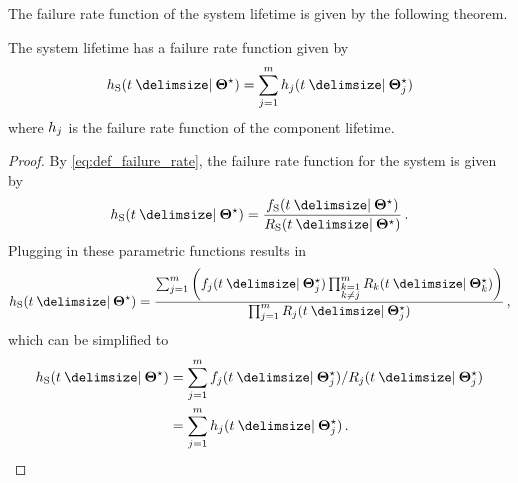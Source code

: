 \documentclass[
    11pt,
    extrafontsizes,
    article,
    oldfontcommands,
    final,
    oneside,
    openany,
    hidelinks]{memoir}
\begin{document}
The failure rate function of the system lifetime is given by the following theorem.
\begin{theorem}
\label{thm:series_failure_rate_function}
The system lifetime has a failure rate function given by
\begin{equation}
\label{eq:series_failure_rate_function}
    \haz_{\sv}(t \Given \tparam\sysparam) =
        \sum_{j=1}^{m}
            \haz_j(t \Given \tparam{\sysparam}_j)
\end{equation}
where $h_j$ is the failure rate function of the \jth component lifetime.
\end{theorem}
\begin{proof}
By \cref{eq:def_failure_rate}, the failure rate function for the system is given by
\begin{equation}
     \haz_{\sv}(t \Given \tparam\sysparam) = \frac{\spdf(t \Given \tparam\sysparam)}{\srv_{\sv}(t \Given \tparam\sysparam)}\,.
\end{equation}
Plugging in these parametric functions results in
\begin{equation}
\haz_{\sv}(t \Given \tparam{\sysparam}) = \frac{\sum_{j=1}^{m} \left(\pdf_j(t \Given \tparam{\sysparam}_j) \prod_{\substack{k=1\\k \neq j}}^{m} \srv_k(t \Given \tparam{\sysparam}_k)\right )}{\prod_{j=1}^{m} \srv_j(t \Given \tparam{\sysparam}_j)}\,,
\end{equation}
which can be simplified to
\begin{align}
\haz_{\sv}(t \Given \tparam{\sysparam})
    &= \sum_{j=1}^{m} \pdf_j(t \Given \tparam{\sysparam}_j) / \srv_j(t \Given \tparam{\sysparam}_j)\\
    &= \sum_{j=1}^{m} \haz_j(t \Given \tparam{\sysparam}_j)\,.
\end{align}
\end{proof}
\end{document}
